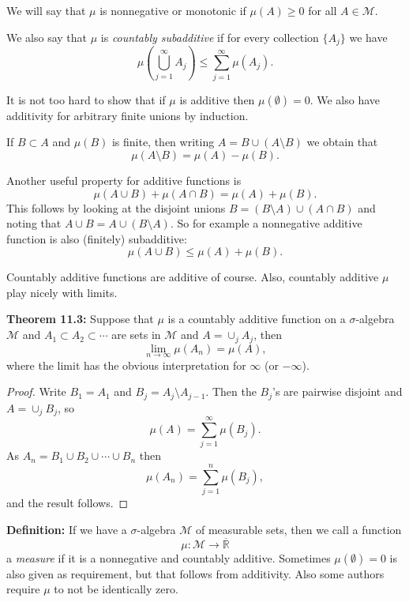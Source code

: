 \documentclass[12pt]{book}
\newcommand{\R}{{\mathbb{R}}}
\newcommand{\sM}{{\mathcal{M}}}
\theoremstyle{plain}
\theoremstyle{remark}
\theoremstyle{definition}
\theoremstyle{exercise}
\theoremstyle{example}
\begin{document}
We will say that $\mu$ is nonnegative or monotonic if $\mu(A) \geq 0$ for all $A \in \sM$.

We also say that
$\mu$ is \emph{countably subadditive} if for every collection
$\{ A_j \}$ we have
$$
\mu \left( \bigcup_{j=1}^\infty A_j \right) \leq
\sum_{j=1}^\infty \mu (A_j) .
$$

\medskip

It is not too hard to show that if $\mu$ is additive then $\mu(\emptyset) =
0$.  We also have additivity for arbitrary finite unions by induction.

If $B \subset A$ and $\mu(B)$ is finite, then
writing $A = B \cup (A\setminus B)$ we obtain that 
$$
\mu(A\setminus B) = \mu(A) - \mu(B) .
$$

Another useful property for additive functions is
$$
\mu(A \cup B) + \mu(A \cap B) = \mu(A) + \mu(B) .
$$
This follows by looking at the disjoint unions
$B = (B \setminus A) \cup (A \cap B)$ and noting that $A \cup B = A \cup (B
\setminus A)$.  So for example a nonnegative additive function is
also (finitely) subadditive:
$$
\mu(A \cup B) \leq \mu(A) + \mu(B) .
$$

Countably additive functions are additive of course.
Also, countably additive $\mu$ play nicely with limits.

\medskip

\textbf{Theorem 11.3:}
Suppose that $\mu$ is a countably additive function on a $\sigma$-algebra
$\sM$ and $A_1 \subset A_2 \subset \cdots$ are sets in $\sM$
and $A = \cup_j A_j$, then
$$
\lim_{n \to \infty} \mu(A_n) = \mu (A) ,
$$
where the limit has the obvious interpretation for $\infty$ (or $-\infty$).

\medskip

\begin{proof}
Write $B_1 = A_1$ and $B_j = A_j \setminus A_{j-1}$.
Then the $B_j$'s are pairwise disjoint and $A = \cup_j B_j$, so
$$
\mu(A) = \sum_{j=1}^\infty \mu(B_j) .
$$
As $A_n = B_1 \cup B_2 \cup \cdots \cup B_n$ then
$$
\mu(A_n) = \sum_{j=1}^n \mu(B_j) ,
$$
and the result follows.
\end{proof}

\medskip

\textbf{Definition:}
If we have a $\sigma$-algebra $\sM$ of measurable sets, then we call a
function
$$
\mu \colon \sM \to \overline{\R}
$$
a \emph{measure} if it is a nonnegative and countably additive.  Sometimes
$\mu(\emptyset) = 0$ is also given as requirement, but that follows from
additivity.  Also some authors require $\mu$ to not be identically zero.
\end{document}
